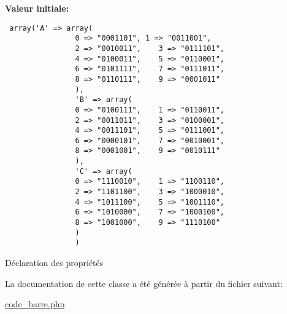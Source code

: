 {\bf Valeur initiale:}

\footnotesize\begin{verbatim} array('A' => array(
                0 => "0001101", 1 => "0011001",
                2 => "0010011",    3 => "0111101",
                4 => "0100011",    5 => "0110001",
                6 => "0101111",    7 => "0111011",
                8 => "0110111",    9 => "0001011"
                ),
                'B' => array(
                0 => "0100111",    1 => "0110011",
                2 => "0011011",    3 => "0100001",
                4 => "0011101",    5 => "0111001",
                6 => "0000101",    7 => "0010001",
                8 => "0001001",    9 => "0010111"
                ),
                'C' => array(
                0 => "1110010",    1 => "1100110",
                2 => "1101100",    3 => "1000010",
                4 => "1011100",    5 => "1001110",
                6 => "1010000",    7 => "1000100",
                8 => "1001000",    9 => "1110100"
                )
                )
\end{verbatim}\normalsize 
D\'{e}claration des propri\'{e}t\'{e}s 

La documentation de cette classe a \'{e}t\'{e} g\'{e}n\'{e}r\'{e}e \`{a} partir du fichier suivant:\begin{CompactItemize}
\item 
\hyperlink{code__barre_8php}{code\_\-barre.php}\end{CompactItemize}
